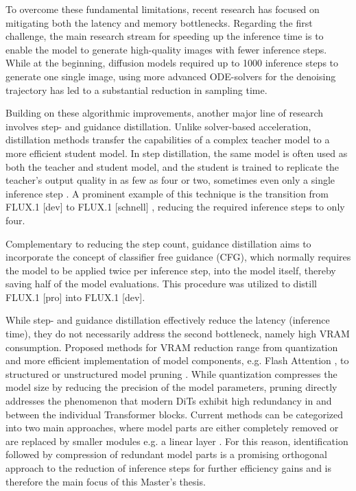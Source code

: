   To overcome these fundamental limitations, recent research has focused on mitigating both the latency and memory bottlenecks. Regarding the first challenge, the main research stream for speeding up the inference time is to enable the model to generate high-quality images with fewer inference steps. While at the beginning, diffusion models required up to 1000 inference steps to generate one single image, using more advanced \gls{ODE}-solvers \cite{DDIM,lu2025dpm} for the denoising trajectory has led to a substantial reduction in sampling time.
  
   Building on these algorithmic improvements, another major line of research involves step- and guidance distillation. Unlike solver-based acceleration, distillation methods transfer the capabilities of a complex teacher model to a more efficient student model. In step distillation, the same model is often used as both the teacher and student model, and the student is trained to replicate the teacher's output quality in as few as four or two, sometimes even only a single inference step \cite{ADD,LADD,ProgressiveDistillation,ConsistencyModel,LatentConsistencyModel,DistillationMatching}. A prominent example of this technique is the transition from FLUX.1 [dev] to FLUX.1 [schnell] \cite{Flux}, reducing the required inference steps to only four.
  
   Complementary to reducing the step count, guidance distillation \cite{GuidedDistillation} aims to incorporate the concept of classifier free guidance (\gls{CFG}), which normally requires the model to be applied twice per inference step, into the model itself, thereby saving half of the model evaluations. This procedure was utilized to distill FLUX.1 [pro] \cite{Flux} into FLUX.1 [dev].
   
  While step- and guidance distillation effectively reduce the latency (inference time), they do not necessarily address the second bottleneck, namely high \gls{VRAM} consumption. Proposed methods for \gls{VRAM} reduction range from quantization \cite{han2015deep,FluxBit} and more efficient implementation of model components, e.g. Flash Attention \cite{FlashAttention}, to structured or unstructured model pruning \cite{Bksdm,Laptop,Koala,FastFlux,flux1-lite,flux_mini_2024,EcoDiff,PPCL,HierarchicalPrune}. While quantization compresses the model size by reducing the precision of the model parameters, pruning directly addresses the phenomenon that modern \gls{DiT}s exhibit high redundancy in and between the individual Transformer blocks. Current methods can be categorized into two main approaches, where model parts are either completely removed \cite{flux1-lite,Bksdm} or are replaced by smaller modules e.g. a linear layer \cite{FastFlux}. For this reason, identification followed by compression of redundant model parts is a promising orthogonal approach to the reduction of inference steps for further efficiency gains and is therefore the main focus of this Master's thesis.
  
